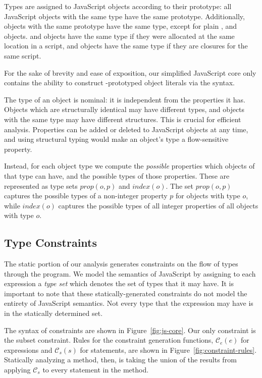 Types are assigned to JavaScript objects according to their prototype:
all JavaScript objects with the same type have the same prototype.
Additionally, objects with the same prototype have the same type,
except for plain ,  and  objects.
 and  objects have the same type if they were
allocated at the same location in a script,
and  objects have the same type if they are closures
for the same script.

For the sake of brevity and ease of exposition, our simplified JavaScript core
only contains the ability to construct -prototyped object
literals via the \code{\{\}} syntax.

The type of an object is nominal: it is independent from the properties it
has. Objects which are structurally identical may have different types, and
objects with the same type may have different structures. This is crucial for
efficient analysis. Properties can be added or deleted to JavaScript objects
at any time, and using structural typing would make an object's type a
flow-sensitive property.

Instead, for each object type we compute the {\it possible} properties which
objects of that type can have, and the possible types of those properties.
These are represented as type sets $\mathit{prop}(o,p)$ and
$\mathit{index}(o)$. The set $\mathit{prop}(o,p)$ captures the possible types
of a non-integer property $p$ for objects with type $o$, while
$\mathit{index}(o)$ captures the possible types of all integer properties of
all objects with type $o$.

\subsection{Type Constraints}
\label{sec:constraints}

The static portion of our analysis generates constraints on the flow of types
through the program. We model the semantics of JavaScript by assigning to each
expression a \emph{type set} which denotes the set of types that it may
have. It is important to note that these statically-generated constraints do
not model the entirety of JavaScript semantics. Not every type that the
expression may have is in the statically determined set.

The syntax of constraints are shown in Figure~\ref{fig:js-core}. Our only
constraint is the subset constraint. Rules for the constraint generation
functions, $\mathcal{C}_e(e)$ for expressions and $\mathcal{C}_s(s)$ for
statements, are shown in Figure~\ref{fig:constraint-rules}. Statically
analyzing a method, then, is taking the union of the results from applying
$\mathcal{C}_s$ to every statement in the method.

